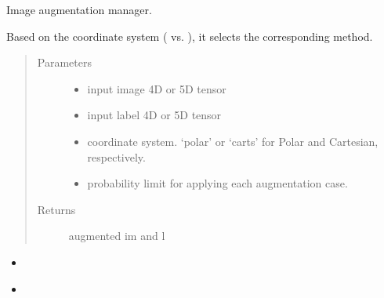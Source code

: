 \documentclass[letterpaper,10pt,english]{sphinxmanual}
\begin{document}
\begin{fulllineitems}
\label{\detokenize{index:util.load_batch.img_aug}}
Image augmentation manager.

Based on the coordinate system ( vs.  ),  it selects the corresponding method.
\begin{quote}\begin{description}
\item[{Parameters}] \leavevmode\begin{itemize}
\item {} 
 \textendash{} input image 4D or 5D tensor

\item {} 
 \textendash{} input label 4D or 5D tensor

\item {} 
 \textendash{} coordinate system.  ‘polar’ or ‘carts’ for Polar and Cartesian,  respectively.

\item {} 
 \textendash{} probability limit for applying each augmentation case.

\end{itemize}

\item[{Returns}] \leavevmode
augmented im and l

\end{description}\end{quote}



\begin{itemize}
\item {} 
{\hyperref[\detokenize{index:util.load_batch.img_aug_carts}]{}}

\item {} 
{\hyperref[\detokenize{index:util.load_batch.img_aug_polar}]{}}

\end{itemize}



\end{fulllineitems}
\end{document}
